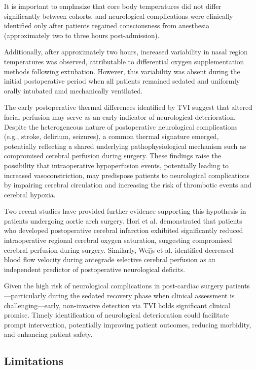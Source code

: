 It is important to emphasize that core body temperatures did not differ significantly between cohorts, and neurological complications were clinically identified only after patients regained consciousness from anesthesia (approximately two to three hours post-admission).

Additionally, after approximately two hours, increased variability in nasal region temperatures was observed, attributable to differential oxygen supplementation methods following extubation. However, this variability was absent during the initial postoperative period when all patients remained sedated and uniformly orally intubated amd mechanically ventilated.

The early postoperative thermal differences identified by TVI suggest that altered facial perfusion may serve as an early indicator of neurological deterioration. Despite the heterogeneous nature of postoperative neurological complications (e.g., stroke, delirium, seizures), a common thermal signature emerged, potentially reflecting a shared underlying pathophysiological mechanism such as compromised cerebral perfusion during surgery. These findings raise the possibility that intraoperative hypoperfusion events, potentially leading to increased vasoconstriction, may predispose patients to neurological complications by impairing cerebral circulation and increasing the risk of thrombotic events and cerebral hypoxia.

Two recent studies have provided further evidence supporting this hypothesis in patients undergoing aortic arch surgery. Hori et al. \cite{hori2024prevalence} demonstrated that patients who developed postoperative cerebral infarction exhibited significantly reduced intraoperative regional cerebral oxygen saturation, suggesting compromised cerebral perfusion during surgery. Similarly, Weijs et al. \cite{weijs2023perioperative} identified decreased blood flow velocity during antegrade selective cerebral perfusion as an independent predictor of postoperative neurological deficits.


Given the high risk of neurological complications in post-cardiac surgery patients—particularly during the sedated recovery phase when clinical assessment is challenging—early, non-invasive detection via TVI holds significant clinical promise. Timely identification of neurological deterioration could facilitate prompt intervention, potentially improving patient outcomes, reducing morbidity, and enhancing patient safety.

\subsection{Limitations}

